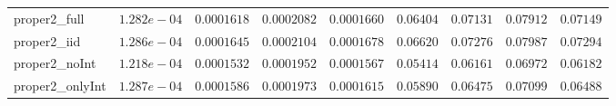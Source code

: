 \begin{table}
\begin{tabular}{lcccccccc}
proper2_full  & $1.282e-04$ & $0.0001618$ & $0.0002082$ & $0.0001660$ & $0.06404$ & $0.07131$ & $0.07912$ & $0.07149$ \\
proper2_iid  & $1.286e-04$ & $0.0001645$ & $0.0002104$ & $0.0001678$ & $0.06620$ & $0.07276$ & $0.07987$ & $0.07294$ \\
proper2_noInt  & $1.218e-04$ & $0.0001532$ & $0.0001952$ & $0.0001567$ & $0.05414$ & $0.06161$ & $0.06972$ & $0.06182$ \\
proper2_onlyInt  & $1.287e-04$ & $0.0001586$ & $0.0001973$ & $0.0001615$ & $0.05890$ & $0.06475$ & $0.07099$ & $0.06488$ \\
\hline 
\end{tabular}


\end{table}